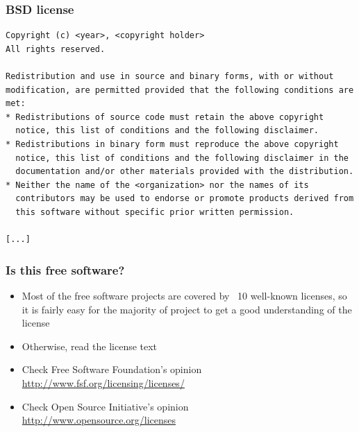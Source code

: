 \begin{frame}[fragile]
  \frametitle{BSD license}
  \begin{block}{}
  \tiny
  \begin{verbatim}
Copyright (c) <year>, <copyright holder>
All rights reserved.

Redistribution and use in source and binary forms, with or without
modification, are permitted provided that the following conditions are
met:
* Redistributions of source code must retain the above copyright
  notice, this list of conditions and the following disclaimer.
* Redistributions in binary form must reproduce the above copyright
  notice, this list of conditions and the following disclaimer in the
  documentation and/or other materials provided with the distribution.
* Neither the name of the <organization> nor the names of its
  contributors may be used to endorse or promote products derived from
  this software without specific prior written permission.

[...]
\end{verbatim}
  \end{block}
\end{frame}

\begin{frame}
  \frametitle{Is this free software?}
  \begin{itemize}
  \item Most of the free software projects are covered by ~10
    well-known licenses, so it is fairly easy for the majority of
    project to get a good understanding of the license
  \item Otherwise, read the license text
  \item Check Free Software Foundation's opinion\\
    \url{http://www.fsf.org/licensing/licenses/}
  \item Check Open Source Initiative's opinion\\
    \url{http://www.opensource.org/licenses}
  \end{itemize}
\end{frame}

